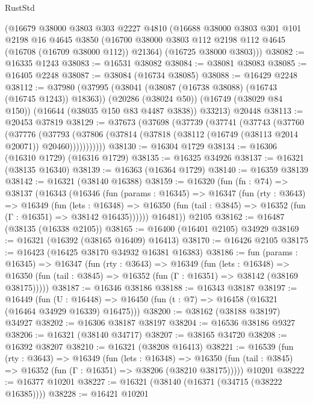 \begin{lexlean}{RustStd}
\begin{coremodule}
    (@16679
      @38000
      @3803
      @303
      @2227
      @4810
      (@16688
        @38000
        @3803
        @301
        @101
        @2198
        @16
        @4645
        @3850
        (@16700 @38000 @3803 @112 @2198 @112 @4645 (@16708 (@16709 @38000 @112)) @21364)
        (@16725 @38000 @3803)))
@38082 := @16335 @1243
@38083 := @16531 @38082
@38084 := @38081 @38083
@38085 := @16405 @2248
@38087 := @38084 (@16734 @38085)
@38088 := @16429 @2248
@38112 := @37980
    (@37995
      (@38041 (@38087 (@16738 @38088) (@16743 (@16745 @1243)) @18363))
      (@20286 (@38024 @50))
      (@16749 (@38029 @84 @150))
      (@16644 (@38035 @150 @83 @4487 @3838))
      @33213)
    @20448
@38113 := @20453 @37819
@38129 := @37673
    (@37698
      (@37739
        (@37741
          (@37743
            (@37760
              (@37776
                (@37793
                  (@37806 (@37814 (@37818 (@38112 (@16749 (@38113 @2014 @20071)) @20460)))))))))))
@38130 := @16304 @1729
@38134 := @16306 (@16310 @1729) (@16316 @1729)
@38135 := @16325 @34926
@38137 := @16321 (@38135 @16340)
@38139 := @16363 (@16364 @1729)
@38140 := @16359 @38139
@38142 := @16321 (@38140 @16388)
@38159 := @16320
    (fun (fn : @74) =>
    @38137
      (@16343
        (@16346
          (fun (params : @16345) =>
          @16347
            (fun (rty : @3643) =>
            @16349
              (fun (lets : @16348) =>
              @16350 (fun (tail : @3845) => @16352 (fun (Γ : @16351) => @38142 @16435))))))
        @16481))
    @2105
@38162 := @16487 (@38135 (@16338 @2105))
@38165 := @16400 (@16401 @2105) @34929
@38169 := @16321 (@16392 (@38165 @16409) @16413)
@38170 := @16426 @2105
@38175 := @16423 (@16425 @38170 @34932 @16381 @16383)
@38186 := fun (params : @16345) =>
  @16347
    (fun (rty : @3643) =>
    @16349
      (fun (lets : @16348) =>
      @16350 (fun (tail : @3845) => @16352 (fun (Γ : @16351) => @38142 (@38169 @38175)))))
@38187 := @16346 @38186
@38188 := @16343 @38187
@38197 := @16449
    (fun (U : @16448) => @16450 (fun (t : @7) => @16458 (@16321 (@16464 @34929 @16339) @16475)))
@38200 := @38162 (@38188 @38197) @34927
@38202 := @16306 @38187 @38197
@38204 := @16536 @38186 @9327
@38206 := @16321 (@38140 @34717)
@38207 := @38165 @34720
@38208 := @16392 @38207
@38210 := @16321 (@38208 @16413)
@38221 := @16539
    (fun (rty : @3643) =>
    @16349
      (fun (lets : @16348) =>
      @16350 (fun (tail : @3845) => @16352 (fun (Γ : @16351) => @38206 (@38210 @38175)))))
    @10201
@38222 := @16377 @10201
@38227 := @16321 (@38140 (@16371 (@34715 (@38222 @16385))))
@38228 := @16421 @10201

\end{coremodule}
\end{lexlean}
